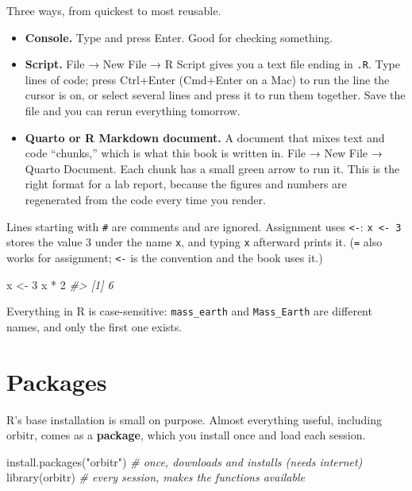 \documentclass[
  10.5pt,
  letterpaper,
]{scrbook}
\newenvironment{Shaded}{\begin{snugshade}}{\end{snugshade}}
\newcommand{\CommentTok}[1]{\textcolor[rgb]{0.00,0.00,0.00}{\textit{#1}}}
\newcommand{\DecValTok}[1]{\textcolor[rgb]{0.00,0.00,0.00}{#1}}
\newcommand{\FunctionTok}[1]{\textcolor[rgb]{0.00,0.00,0.00}{#1}}
\newcommand{\NormalTok}[1]{\textcolor[rgb]{0.00,0.00,0.00}{#1}}
\newcommand{\OtherTok}[1]{\textcolor[rgb]{0.00,0.00,0.00}{#1}}
\newcommand{\SpecialCharTok}[1]{\textcolor[rgb]{0.00,0.00,0.00}{#1}}
\newcommand{\StringTok}[1]{\textcolor[rgb]{0.00,0.00,0.00}{#1}}
\providecommand{\tightlist}{%
  \setlength{\itemsep}{0pt}\setlength{\parskip}{0pt}}
\theoremstyle{plain}
\theoremstyle{remark}
\begin{document}
Three ways, from quickest to most reusable.

\begin{itemize}
\tightlist
\item
  \textbf{Console.} Type and press Enter. Good for checking something.
\item
  \textbf{Script.} File → New File → R Script gives you a text file
  ending in \texttt{.R}. Type lines of code; press Ctrl+Enter (Cmd+Enter
  on a Mac) to run the line the cursor is on, or select several lines
  and press it to run them together. Save the file and you can rerun
  everything tomorrow.
\item
  \textbf{Quarto or R Markdown document.} A document that mixes text and
  code ``chunks,'' which is what this book is written in. File → New
  File → Quarto Document. Each chunk has a small green arrow to run it.
  This is the right format for a lab report, because the figures and
  numbers are regenerated from the code every time you render.
\end{itemize}

Lines starting with \texttt{\#} are comments and are ignored. Assignment
uses \texttt{\textless{}-}: \texttt{x\ \textless{}-\ 3} stores the value
3 under the name \texttt{x}, and typing \texttt{x} afterward prints it.
(\texttt{=} also works for assignment; \texttt{\textless{}-} is the
convention and the book uses it.)

\begin{Shaded}
\begin{Highlighting}[]
\NormalTok{x }\OtherTok{\textless{}{-}} \DecValTok{3}
\NormalTok{x }\SpecialCharTok{*} \DecValTok{2}
\CommentTok{\#\textgreater{} [1] 6}
\end{Highlighting}
\end{Shaded}

Everything in R is case-sensitive: \texttt{mass\_earth} and
\texttt{Mass\_Earth} are different names, and only the first one exists.

\section{Packages}\label{packages}

R's base installation is small on purpose. Almost everything useful,
including orbitr, comes as a \textbf{package}, which you install once
and load each session.

\begin{Shaded}
\begin{Highlighting}[]
\FunctionTok{install.packages}\NormalTok{(}\StringTok{"orbitr"}\NormalTok{)      }\CommentTok{\# once, downloads and installs (needs internet)}
\FunctionTok{library}\NormalTok{(orbitr)                 }\CommentTok{\# every session, makes the functions available}
\end{Highlighting}
\end{Shaded}
\end{document}

